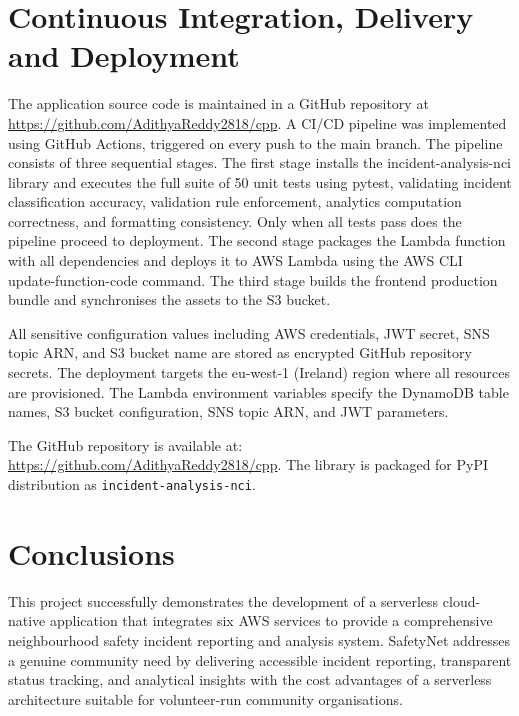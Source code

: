 \documentclass[conference]{IEEEtran}
\begin{document}
\section{Continuous Integration, Delivery and Deployment}

The application source code is maintained in a GitHub repository at \url{https://github.com/AdithyaReddy2818/cpp}. A CI/CD pipeline was implemented using GitHub Actions, triggered on every push to the main branch. The pipeline consists of three sequential stages. The first stage installs the incident-analysis-nci library and executes the full suite of 50 unit tests using pytest, validating incident classification accuracy, validation rule enforcement, analytics computation correctness, and formatting consistency. Only when all tests pass does the pipeline proceed to deployment. The second stage packages the Lambda function with all dependencies and deploys it to AWS Lambda using the AWS CLI update-function-code command. The third stage builds the frontend production bundle and synchronises the assets to the S3 bucket.

All sensitive configuration values including AWS credentials, JWT secret, SNS topic ARN, and S3 bucket name are stored as encrypted GitHub repository secrets. The deployment targets the eu-west-1 (Ireland) region where all resources are provisioned. The Lambda environment variables specify the DynamoDB table names, S3 bucket configuration, SNS topic ARN, and JWT parameters.

The GitHub repository is available at: \url{https://github.com/AdithyaReddy2818/cpp}. The library is packaged for PyPI distribution as \texttt{incident-analysis-nci}.

\section{Conclusions}

This project successfully demonstrates the development of a serverless cloud-native application that integrates six AWS services to provide a comprehensive neighbourhood safety incident reporting and analysis system. SafetyNet addresses a genuine community need by delivering accessible incident reporting, transparent status tracking, and analytical insights with the cost advantages of a serverless architecture suitable for volunteer-run community organisations.
\end{document}
